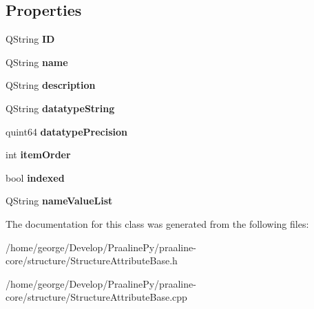 \subsection*{Properties}
\begin{DoxyCompactItemize}
\item 
\mbox{\label{class_structure_attribute_base_adf7b83008b41837e2cde7cba05df67dc}} 
Q\+String {\bfseries ID}
\item 
\mbox{\label{class_structure_attribute_base_aea726e246c4b6b2e6cf4fcca650dd7f4}} 
Q\+String {\bfseries name}
\item 
\mbox{\label{class_structure_attribute_base_aa00814c0d39735c34061b60e479cdba5}} 
Q\+String {\bfseries description}
\item 
\mbox{\label{class_structure_attribute_base_adff39d1dc8975bacef92ed1a49e37899}} 
Q\+String {\bfseries datatype\+String}
\item 
\mbox{\label{class_structure_attribute_base_aaee604f0a2f7b7a59cbde6ec0d329435}} 
quint64 {\bfseries datatype\+Precision}
\item 
\mbox{\label{class_structure_attribute_base_a3b91e64ff2404aad785f03e7fd564726}} 
int {\bfseries item\+Order}
\item 
\mbox{\label{class_structure_attribute_base_a6e00200fe51ac13495a848957643da5d}} 
bool {\bfseries indexed}
\item 
\mbox{\label{class_structure_attribute_base_a703ea9ae1eb12124ca48068daa58b7a5}} 
Q\+String {\bfseries name\+Value\+List}
\end{DoxyCompactItemize}


The documentation for this class was generated from the following files\+:\begin{DoxyCompactItemize}
\item 
/home/george/\+Develop/\+Praaline\+Py/praaline-\/core/structure/Structure\+Attribute\+Base.\+h\item 
/home/george/\+Develop/\+Praaline\+Py/praaline-\/core/structure/Structure\+Attribute\+Base.\+cpp\end{DoxyCompactItemize}
